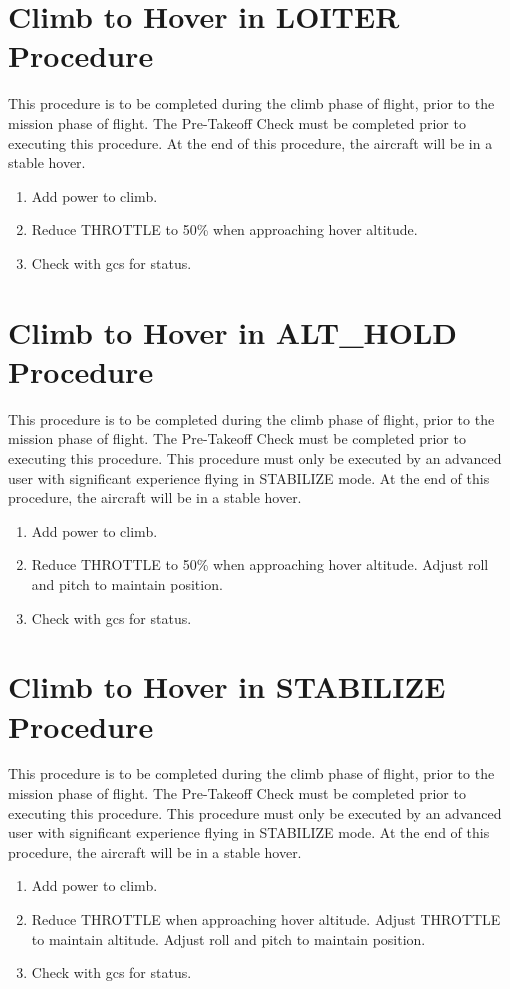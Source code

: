 \documentclass{report}
\begin{document}
	\section{Climb to Hover in LOITER Procedure}
		This procedure is to be completed during the climb phase of flight, prior to the mission phase of flight.  The Pre-Takeoff Check must be completed prior to executing this procedure.  At the end of this procedure, the aircraft will be in a stable hover.
		\begin{enumerate}
			\item Add power to climb.
			\item Reduce THROTTLE to 50\% when approaching hover altitude.
			\item Check with \gls{gcs} for status.
		\end{enumerate}
	\section{Climb to Hover in ALT\_HOLD Procedure}
		This procedure is to be completed during the climb phase of flight, prior to the mission phase of flight.  The Pre-Takeoff Check must be completed prior to executing this procedure.  This procedure must only be executed by an advanced user with significant experience flying in STABILIZE mode.  At the end of this procedure, the aircraft will be in a stable hover.
		\begin{enumerate}
			\item Add power to climb.
			\item Reduce THROTTLE to 50\% when approaching hover altitude.  Adjust roll and pitch to maintain position.
			\item Check with \gls{gcs} for status.
		\end{enumerate}
	\section{Climb to Hover in STABILIZE Procedure}
		This procedure is to be completed during the climb phase of flight, prior to the mission phase of flight.  The Pre-Takeoff Check must be completed prior to executing this procedure.  This procedure must only be executed by an advanced user with significant experience flying in STABILIZE mode.  At the end of this procedure, the aircraft will be in a stable hover.
		\begin{enumerate}
			\item Add power to climb.
			\item Reduce THROTTLE when approaching hover altitude.  Adjust THROTTLE to maintain altitude.  Adjust roll and pitch to maintain position.
			\item Check with \gls{gcs} for status.
		\end{enumerate}
\end{document}

